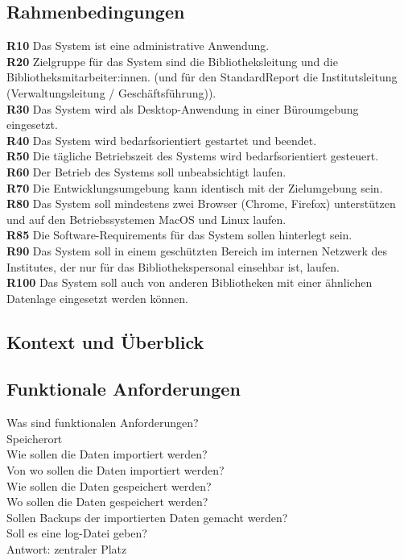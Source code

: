 \subsection{Rahmenbedingungen}
\textbf{R10} Das System ist eine administrative Anwendung.\\ 
\textbf{R20} Zielgruppe für das System sind die Bibliotheksleitung und die Bibliotheksmitarbeiter:innen. (und für den StandardReport die Institutsleitung
(Verwaltungsleitung / Geschäftsführung)).\\
\textbf{R30} Das System wird als Desktop-Anwendung in einer Büroumgebung eingesetzt.\\
\textbf{R40} Das System wird bedarfsorientiert gestartet und beendet.\\
\textbf{R50} Die tägliche Betriebszeit des Systems wird bedarfsorientiert gesteuert.\\
\textbf{R60} Der Betrieb des Systems soll unbeabsichtigt laufen.\\
\textbf{R70} Die Entwicklungsumgebung kann identisch mit der Zielumgebung sein.\\
\textbf{R80} Das System soll mindestens zwei Browser (Chrome, Firefox) unterstützen und auf den Betriebssystemen MacOS und Linux laufen.\\
\textbf{R85} Die Software-Requirements für das System sollen hinterlegt sein.\\
\textbf{R90} Das System soll in einem geschützten Bereich im internen Netzwerk des Institutes, der nur für das Bibliothekspersonal einsehbar ist, laufen.\\
\textbf{R100} Das System soll auch von anderen Bibliotheken mit einer ähnlichen Datenlage eingesetzt werden können.



\subsection{Kontext und Überblick}


\subsection{Funktionale Anforderungen}
Was sind funktionalen Anforderungen?\\
Speicherort\\
Wie sollen die Daten importiert werden?\\
Von wo sollen die Daten importiert werden?\\
Wie sollen die Daten gespeichert werden?\\
Wo sollen die Daten gespeichert werden?\\
Sollen Backups der importierten Daten gemacht werden?\\
Soll es eine log-Datei geben?\\
Antwort: zentraler Platz\\

